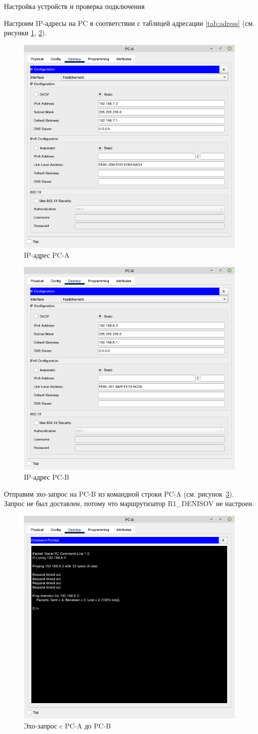 \documentclass[a4paper,14pt]{extarticle}
\begin{document}
\begin{mypart}{Настройка устройств и проверка подключения}


Настроим IP-адресы на PC в соответствии с таблицей адресации \ref{tab:adress} (см. рисунки \ref{fig:pract5-pc-a-ip}, \ref{fig:pract5-pc-b-ip1}).

\begin{figure}[h!]
	\centering
	\includegraphics[width=0.4\linewidth]{images/pract5-pc-a-ip}
	\caption{IP-адрес PC-A}
	\label{fig:pract5-pc-a-ip}
\end{figure}

\begin{figure}[h!]
	\centering
	\includegraphics[width=0.4\linewidth]{images/pract5-pc-b-ip1}
	\caption{IP-адрес PC-B}
	\label{fig:pract5-pc-b-ip1}
\end{figure}

Отправим эхо-запрос на PC-B из командной строки PC-A (см. рисунок~\ref{fig:pract5-ping}). Запрос не был доставлен, потому что маршрутизатор R1\_DENISOV не настроен.

\begin{figure}[h!]
	\centering
	\includegraphics[width=0.5\linewidth]{images/pract5-ping}
	\caption{Эхо-запрос c PC-A до PC-B }
	\label{fig:pract5-ping}
\end{figure}


\end{mypart}
\end{document}
